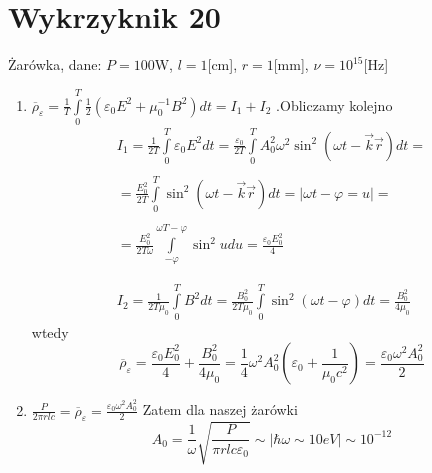 \documentclass[a4paper,12pt]{article}
\begin{document}
\section{Wykrzyknik 20}
	Żarówka, dane: $P=100$W, $l = 1$[cm], $r=1$[mm], $\nu=10^{15}$[Hz]
	\begin{enumerate}
		\item $\overline{\rho}_\varepsilon  = \frac{1}{T}\int\limits_0^T\frac{1}{2}(\varepsilon_0E^2+\mu_0^{-1}B^2)dt = I_1+I_2$
		.Obliczamy kolejno
		$$
		\begin{gathered}
			I_1 = \frac{1}{2T}\int\limits_0^T\varepsilon_0E^2 dt = \frac{\varepsilon_0}{2T}\int\limits_0^TA_0^2\omega^2\sin^2(\omega t -\vec{k}\vec{r})dt = \\\\
				= \frac{E_0^2}{2T}\int\limits_0^T\sin^2(\omega t -\vec{k}\vec{r})dt = \big\vert \omega t - \varphi = u\big\vert = \\\\
				= \frac{E_0^2}{2T\omega}\int\limits_{-\varphi}^{\omega T-\varphi}\sin^2u du = \frac{\varepsilon_0 E_0^2}{4} \\\\\\
			I_2 = \frac{1}{2T\mu_0}\int\limits_0^T B^2 dt = \frac{B_0^2}{2T\mu_0}\int\limits_0^T\sin^2(\omega t -\varphi)dt = \frac{B_0^2}{4\mu_0}
		\end{gathered}
		$$
		wtedy 
		$$
			\overline{\rho}_\varepsilon = \frac{\varepsilon_0 E_0^2}{4}+ \frac{B_0^2}{4\mu_0} = \frac{1}{4}\omega^2A_0^2(\varepsilon_0+\frac{1}{\mu_0c^2})=\frac{\varepsilon_0\omega^2A_0^2}{2}
		$$
		\item $\frac{P}{2\pi r l c} = \overline{\rho}_\varepsilon = \frac{\varepsilon_0\omega^2A_0^2}{2}$
		Zatem dla naszej żarówki 
		$$
			A_0 = \frac{1}{\omega}\sqrt{\frac{P}{\pi r l c \varepsilon_0}} \sim \big\vert \hbar \omega \sim 10eV\big\vert \sim 10^{-12}
		$$
	\end{enumerate}
\end{document}
